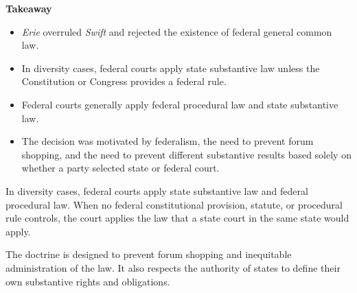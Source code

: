 \documentclass[11pt]{tex/lawoutline}
\begin{document}
{
\textbf{Takeaway}
\begin{itemize}
    \item \textit{Erie} overruled \textit{Swift} and rejected the existence of federal general common law.
    \item In diversity cases, federal courts apply state substantive law unless the Constitution or Congress provides a federal rule.
    \item Federal courts generally apply federal procedural law and state substantive law.
    \item The decision was motivated by federalism, the need to prevent forum shopping, and the need to prevent different substantive results based solely on whether a party selected state or federal court.
\end{itemize}
}

{
In diversity cases, federal courts apply state substantive law and federal procedural law. When no federal constitutional provision, statute, or procedural rule controls, the court applies the law that a state court in the same state would apply.

The doctrine is designed to prevent forum shopping and inequitable administration of the law. It also respects the authority of states to define their own substantive rights and obligations.
}
\end{document}
